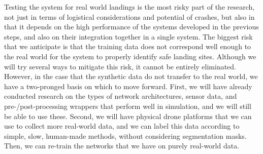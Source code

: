 Testing the system for real world landings is the most risky part of the research,
not just in terms of logistical considerations and potential of crashes,
but also in that it depends on the high performance of the systems developed in the previous steps,
and also on their integration together in a single system.
The biggest risk that we anticipate is that the training data does not correspond well enough to the
real world for the system to properly identify safe landing sites.
Although we will try several ways to mitigate this risk, it cannot be entirely eliminated.
However, in the case that the synthetic data do not transfer to the real world,
we have a two-pronged basis on which to move forward.
First, we will have already conducted research on the types of network architectures,
sensor data, and pre-/post-processing wrappers that perform well in simulation,
and we will still be able to use these.
Second, we will have physical drone platforms that we can use to collect more real-world data,
and we can label this data according to simple, slow, human-made methods,
without considering segmentation masks.
Then, we can re-train the networks that we have on purely real-world data.